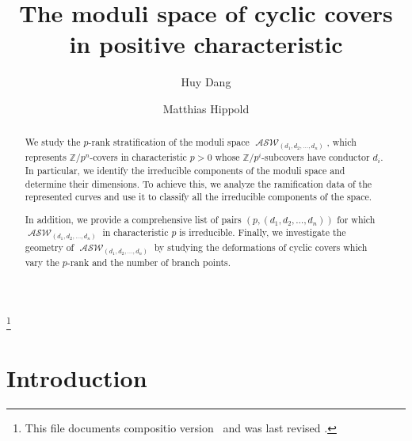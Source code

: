 \documentclass{compositio}
\newcommand*{\pkg}[1]{{\mdseries\textsf{#1}}}
\theoremstyle{remark}
\theoremstyle{remark}
\DeclareMathOperator{\ASW}{\mathcal{ASW}}
\begin{document}
\title{The moduli space of cyclic covers in positive characteristic}

\author{Huy Dang}
\address{National Center for Theoretical Sciences, Mathematics Division, No. 1, Sec. 4, Roosevelt Rd., Taipei City 106, Taiwan Room 503, Cosmology Building, National Taiwan University}

\author{Matthias Hippold}
\address{Einstein Institute of Mathematics, The Hebrew University of Jerusalem, Edmond J.
Safra Campus, Giv’at Ram, Jerusalem, 91904, Israel }


\thanks{This file documents \pkg{compositio} version \Fileversion\ and
was last revised \Filedate.}


\begin{abstract}
We study the $p$-rank stratification of the moduli space $\ASW_{(d_1,d_2,\ldots,d_n)}$, which represents $\mathbb{Z}/p^n$-covers in characteristic $p>0$ whose $\mathbb{Z}/p^i$-subcovers have conductor $d_i$. In particular, we identify the irreducible components of the moduli space and determine their dimensions. To achieve this, we analyze the ramification data of the represented curves and use it to classify all the irreducible components of the space.

In addition, we provide a comprehensive list of pairs $(p,(d_1,d_2,\ldots,d_n))$ for which $\ASW_{(d_1,d_2,\ldots,d_n)}$ in characteristic $p$ is irreducible. Finally, we investigate the geometry of $\ASW_{(d_1,d_2,\ldots,d_n)}$ by studying the deformations of cyclic covers which vary the $p$-rank and the number of branch points.
\end{abstract}
 
\maketitle

\vspace*{6pt}\tableofcontents

\section{Introduction}
\end{document}
